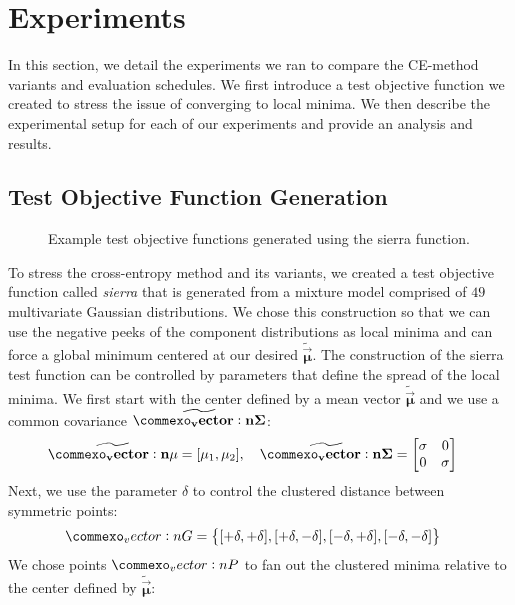 

\section{Experiments} \label{sec:cem_experiments}
In this section, we detail the experiments we ran to compare the CE-method variants and evaluation schedules.
We first introduce a test objective function we created to stress the issue of converging to local minima. 
We then describe the experimental setup for each of our experiments and provide an analysis and results.


\subsection{Test Objective Function Generation}\label{sec:sierra}
\begin{figure*}[!t]
  \centering
  \resizebox{0.8\textwidth}{!}{}
  \caption{
    \label{fig:sierra}
    Example test objective functions generated using the sierra function.  
  }
\end{figure*}
To stress the cross-entropy method and its variants, we created a test objective function called \textit{sierra} that is generated from a mixture model comprised of $49$ multivariate Gaussian distributions.
We chose this construction so that we can use the negative peeks of the component distributions as local minima and can force a global minimum centered at our desired $\mathbf{\widetilde{\vec{\mu}}}$.
The construction of the sierra test function can be controlled by parameters that define the spread of the local minima.
We first start with the center defined by a mean vector $\mathbf{\widetilde{\vec{\mu}}}$ and we use a common covariance $\mathbf{\widetilde{\mat{\Sigma}}}$:
\begin{align*}
    \mathbf{\widetilde{\vec{\mu}}} &= [\mu_1, \mu_2], \quad \mathbf{\widetilde{\mat{\Sigma}}} = \begin{bmatrix}\sigma & 0\\ 0 & \sigma \end{bmatrix}
\end{align*}
Next, we use the parameter $\delta$ to control the clustered distance between symmetric points:
\begin{align*}
    \mat{G} &= \left\{[+\delta, +\delta], [+\delta, -\delta], [-\delta, +\delta], [-\delta, -\delta]\right\}
\end{align*}
We chose points $\mat{P}$ to fan out the clustered minima relative to the center defined by $\mathbf{\widetilde{\vec{\mu}}}$:
